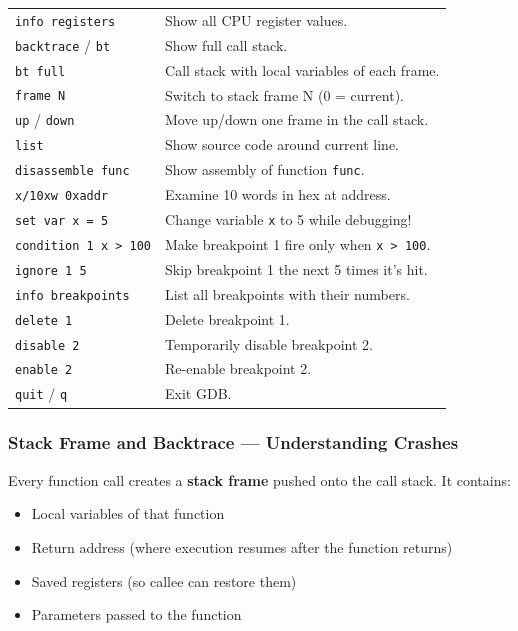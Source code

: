 \documentclass[11pt,a4paper]{article}
\newcommand{\code}[1]{\texttt{\small\colorbox{codebg}{\color{codekw}#1}}}
\newcommand{\term}[1]{\textbf{\color{darkblue}#1}}
\begin{document}
\begin{center}
\begin{longtable}{L{5cm} L{9cm}}
\code{info registers} & Show all CPU register values. \\
\code{backtrace} / \code{bt} & Show full call stack. \\
\code{bt full} & Call stack with local variables of each frame. \\
\code{frame N} & Switch to stack frame N (0 = current). \\
\code{up} / \code{down} & Move up/down one frame in the call stack. \\
\code{list} & Show source code around current line. \\
\code{disassemble func} & Show assembly of function \code{func}. \\
\code{x/10xw 0xaddr} & Examine 10 words in hex at address. \\
\code{set var x = 5} & Change variable \code{x} to 5 while debugging! \\
\code{condition 1 x > 100} & Make breakpoint 1 fire only when \code{x > 100}. \\
\code{ignore 1 5} & Skip breakpoint 1 the next 5 times it's hit. \\
\code{info breakpoints} & List all breakpoints with their numbers. \\
\code{delete 1} & Delete breakpoint 1. \\
\code{disable 2} & Temporarily disable breakpoint 2. \\
\code{enable 2} & Re-enable breakpoint 2. \\
\code{quit} / \code{q} & Exit GDB. \\
\bottomrule
\end{longtable}
\end{center}

\subsubsection{Stack Frame and Backtrace --- Understanding Crashes}

Every function call creates a \term{stack frame} pushed onto the call stack. It contains:
\begin{itemize}[noitemsep]
  \item Local variables of that function
  \item Return address (where execution resumes after the function returns)
  \item Saved registers (so callee can restore them)
  \item Parameters passed to the function
\end{itemize}
\end{document}
